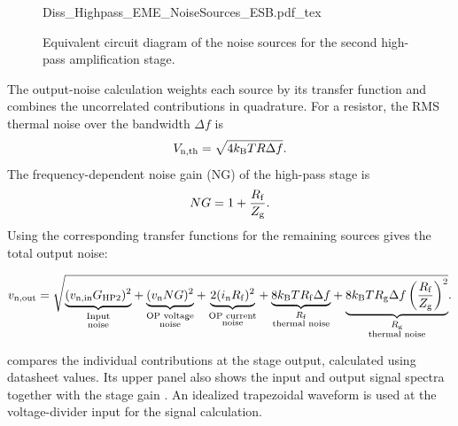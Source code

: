 \begin{figure}[hbt]
	\centering
	{Diss_Highpass_EME_NoiseSources_ESB.pdf_tex}
	\caption{Equivalent circuit diagram of the noise sources for the second high-pass amplification stage.}\label{fig:ESB_OP_noiseSources}
\end{figure}

The output-noise calculation weights each source by its transfer function and combines the uncorrelated contributions in quadrature.
For a resistor, the RMS thermal noise over the bandwidth $\Delta f$ is
\begin{equation}
	{V}_{\mathrm{n,th}} = \sqrt{4{k}_{\mathrm{B}}TR\Delta f}.
\end{equation}
The frequency-dependent noise gain (NG) of the high-pass stage is
\begin{equation}
	 NG = 1 + \frac{{R}_{\mathrm{f}}}{{Z}_{\mathrm{g}}}.
\end{equation}
Using the corresponding transfer functions for the remaining sources gives the total output noise:

\begingroup
\begin{equation}
	\mi{v}{n,out} = \sqrt{
		\vphantom{\left(\frac{\mi{R}{f}}{\mi{Z}{g}}\right)^2}
		\smash[b]{\underbrace{(\mi{v}{n,in} \mi{G}{HP2})^2}_{\substack{\text{Input}\\\text{noise}}}}
		+ \smash[b]{\underbrace{(\mi{v}{n} NG)^2}_{\substack{\text{OP voltage}\\\text{noise}}}}
		+ \smash[b]{\underbrace{2(\mi{i}{n} \mi{R}{f})^2}_{\substack{\text{OP current}\\\text{noise}}}}
		+ \smash[b]{\underbrace{8\mi{k}{B}T\mi{R}{f}\Delta f}_{\substack{\mi{R}{f}\\\text{thermal noise}}}}
		+ \smash[b]{\underbrace{8\mi{k}{B}T\mi{R}{g}\Delta f \left(\frac{\mi{R}{f}}{\mi{Z}{g}}\right)^2}_{\substack{\mi{R}{g}\\\text{thermal noise}}}}
	}\vphantom{\underbrace{\left(\frac{\mi{R}{f}}{\mi{Z}{g}}\right)^2}_{\substack{\mi{R}{g}\\\text{thermal noise}}}}.
\end{equation}
\endgroup

 compares the individual contributions at the stage output, calculated using datasheet values.
Its upper panel also shows the input and output signal spectra together with the stage gain .
An idealized trapezoidal waveform is used at the voltage-divider input for the signal calculation.

